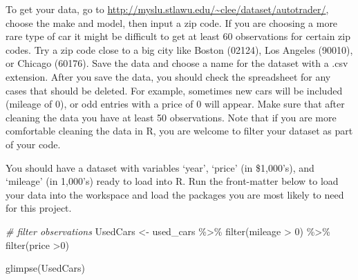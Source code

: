 \documentclass[
]{article}
\newenvironment{Shaded}{\begin{snugshade}}{\end{snugshade}}
\newcommand{\CommentTok}[1]{\textcolor[rgb]{0.56,0.35,0.01}{\textit{#1}}}
\newcommand{\DecValTok}[1]{\textcolor[rgb]{0.00,0.00,0.81}{#1}}
\newcommand{\FunctionTok}[1]{\textcolor[rgb]{0.00,0.00,0.00}{#1}}
\newcommand{\NormalTok}[1]{#1}
\newcommand{\OtherTok}[1]{\textcolor[rgb]{0.56,0.35,0.01}{#1}}
\newcommand{\SpecialCharTok}[1]{\textcolor[rgb]{0.00,0.00,0.00}{#1}}
\begin{document}
To get your data, go to
\url{http://myslu.stlawu.edu/~clee/dataset/autotrader/}, choose the make
and model, then input a zip code. If you are choosing a more rare type
of car it might be difficult to get at least 60 observations for certain
zip codes. Try a zip code close to a big city like Boston (02124), Los
Angeles (90010), or Chicago (60176). Save the data and choose a name for
the dataset with a .csv extension. After you save the data, you should
check the spreadsheet for any cases that should be deleted. For example,
sometimes new cars will be included (mileage of 0), or odd entries with
a price of 0 will appear. Make sure that after cleaning the data you
have at least 50 observations. Note that if you are more comfortable
cleaning the data in R, you are welcome to filter your dataset as part
of your code.

You should have a dataset with variables `year', `price' (in \$1,000's),
and `mileage' (in 1,000's) ready to load into R. Run the front-matter
below to load your data into the workspace and load the packages you are
most likely to need for this project.

\begin{Shaded}
\end{Shaded}

\begin{Shaded}
\begin{Highlighting}[]
\CommentTok{\# filter observations}
\NormalTok{UsedCars }\OtherTok{\textless{}{-}}\NormalTok{ used\_cars }\SpecialCharTok{\%\textgreater{}\%}
  \FunctionTok{filter}\NormalTok{(mileage }\SpecialCharTok{\textgreater{}} \DecValTok{0}\NormalTok{) }\SpecialCharTok{\%\textgreater{}\%}
  \FunctionTok{filter}\NormalTok{(price }\SpecialCharTok{\textgreater{}}\DecValTok{0}\NormalTok{)}
\end{Highlighting}
\end{Shaded}

\begin{Shaded}
\begin{Highlighting}[]
\FunctionTok{glimpse}\NormalTok{(UsedCars)}
\end{Highlighting}
\end{Shaded}
\end{document}
